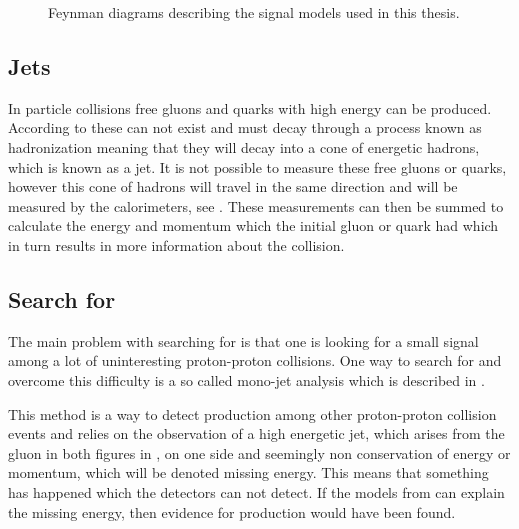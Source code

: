  \begin{figure}[H] %
    \hfill
    \caption{Feynman diagrams describing the signal models used in this thesis.}
    \label{fig:opfeyn}
  \end{figure}


\subsection{Jets}\label{sec:tb:subsec:jets}
In particle collisions free gluons and quarks with high energy can be produced. According to \abbrQFT these can not exist and must decay through a process known as hadronization meaning that they will decay into a cone of energetic hadrons, which is known as a jet. It is not possible to measure these free gluons or quarks, however this cone of hadrons will travel in the same direction and will be measured by the calorimeters, see . These measurements can then be summed to calculate the energy and momentum which the initial gluon or quark had which in turn results in more information about the collision.

\subsection{Search for \abbrWIMPS}\label{sec:tb:subsec:WIMPS}
The main problem with searching for \abbrWIMPS is that one is looking for a small signal among a lot of uninteresting proton-proton collisions. One way to search for \abbrWIMPS and overcome this difficulty is a so called mono-jet analysis which is described in . 

This method is a way to detect \abbrWIMP production among other proton-proton collision events and relies on the observation of a high energetic jet, which arises from the gluon in both figures in , on one side and seemingly non conservation of energy or momentum, which will be denoted missing energy. This means that something has happened which the detectors can not detect. If the models from  can explain the missing energy, then evidence for \abbrWIMP production would have been found.

